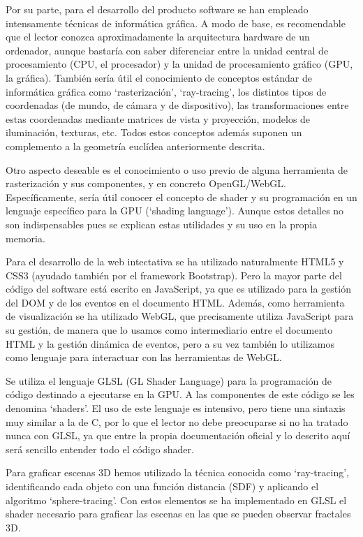 Por su parte, para el desarrollo del producto software se han empleado intensamente técnicas de informática gráfica. A modo de base, es recomendable que el lector conozca aproximadamente la arquitectura hardware de un ordenador, aunque bastaría con saber diferenciar entre la unidad central de procesamiento (CPU, el procesador) y la unidad de procesamiento gráfico (GPU, la gráfica). También sería útil el conocimiento de conceptos estándar de informática gráfica como `rasterización', `ray-tracing', los distintos tipos de coordenadas (de mundo, de cámara y de dispositivo), las transformaciones entre estas coordenadas mediante matrices de vista y proyección, modelos de iluminación, texturas, etc. Todos estos conceptos además suponen un complemento a la geometría euclídea anteriormente descrita. 

Otro aspecto deseable es el conocimiento o uso previo de alguna herramienta de rasterización y sus componentes, y en concreto OpenGL/WebGL. Específicamente, sería útil conocer el concepto de shader y su programación en un lenguaje específico para la GPU (`shading language'). Aunque estos detalles no son indispensables pues se explican estas utilidades y su uso en la propia memoria. 

Para el desarrollo de la web intectativa se ha utilizado naturalmente HTML5 y CSS3 (ayudado también por el framework Bootstrap). Pero la mayor parte del código del software está escrito en JavaScript, ya que es utilizado para la gestión del DOM y de los eventos en el documento HTML. Además, como herramienta de visualización se ha utilizado WebGL, que precisamente utiliza JavaScript para su gestión, de manera que lo usamos como intermediario entre el documento HTML y la gestión dinámica de eventos, pero a su vez también lo utilizamos como lenguaje para interactuar con las herramientas de WebGL.

Se utiliza el lenguaje GLSL (GL Shader Language) para la programación de código destinado a ejecutarse en la GPU. A las componentes de este código se les denomina `shaders'. El uso de este lenguaje es intensivo, pero tiene una sintaxis muy similar a la de C, por lo que el lector no debe preocuparse si no ha tratado nunca con GLSL, ya que entre la propia documentación oficial y lo descrito aquí será sencillo entender todo el código shader.

Para graficar escenas 3D hemos utilizado la técnica conocida como `ray-tracing', identificando cada objeto con una función distancia (SDF) y aplicando el algoritmo `sphere-tracing'. Con estos elementos se ha implementado en GLSL el shader necesario para graficar las escenas en las que se pueden observar fractales 3D.

